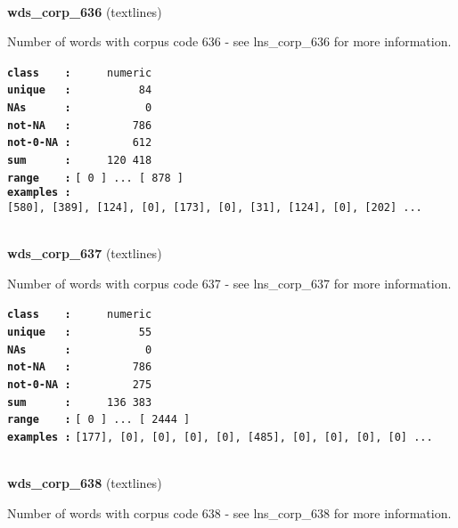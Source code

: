 \documentclass[]{article}
\begin{document}
~

\textbf{wds\_corp\_636} (textlines)

Number of words with corpus code 636 - see lns\_corp\_636 for more
information.

\textbf{\texttt{class\ \ \ \ :}} \texttt{~~~~~numeric}\\
\textbf{\texttt{unique\ \ \ :}} \texttt{~~~~~~~~~~84}\\
\textbf{\texttt{NAs\ \ \ \ \ \ :}} \texttt{~~~~~~~~~~~0}\\
\textbf{\texttt{not-NA\ \ \ :}} \texttt{~~~~~~~~~786}\\
\textbf{\texttt{not-0-NA\ :}} \texttt{~~~~~~~~~612}\\
\textbf{\texttt{sum\ \ \ \ \ \ :}} \texttt{~~~~~120~418}\\
\textbf{\texttt{range\ \ \ \ :}}
\texttt{{[}\ 0\ {]}\ ...\ {[}\ 878\ {]}}\\
\textbf{\texttt{examples\ :}}
\texttt{{[}580{]},\ {[}389{]},\ {[}124{]},\ {[}0{]},\ {[}173{]},\ {[}0{]},\ {[}31{]},\ {[}124{]},\ {[}0{]},\ {[}202{]}\ ...}\\

~

\textbf{wds\_corp\_637} (textlines)

Number of words with corpus code 637 - see lns\_corp\_637 for more
information.

\textbf{\texttt{class\ \ \ \ :}} \texttt{~~~~~numeric}\\
\textbf{\texttt{unique\ \ \ :}} \texttt{~~~~~~~~~~55}\\
\textbf{\texttt{NAs\ \ \ \ \ \ :}} \texttt{~~~~~~~~~~~0}\\
\textbf{\texttt{not-NA\ \ \ :}} \texttt{~~~~~~~~~786}\\
\textbf{\texttt{not-0-NA\ :}} \texttt{~~~~~~~~~275}\\
\textbf{\texttt{sum\ \ \ \ \ \ :}} \texttt{~~~~~136~383}\\
\textbf{\texttt{range\ \ \ \ :}}
\texttt{{[}\ 0\ {]}\ ...\ {[}\ 2444\ {]}}\\
\textbf{\texttt{examples\ :}}
\texttt{{[}177{]},\ {[}0{]},\ {[}0{]},\ {[}0{]},\ {[}0{]},\ {[}485{]},\ {[}0{]},\ {[}0{]},\ {[}0{]},\ {[}0{]}\ ...}\\

~

\textbf{wds\_corp\_638} (textlines)

Number of words with corpus code 638 - see lns\_corp\_638 for more
information.
\end{document}

